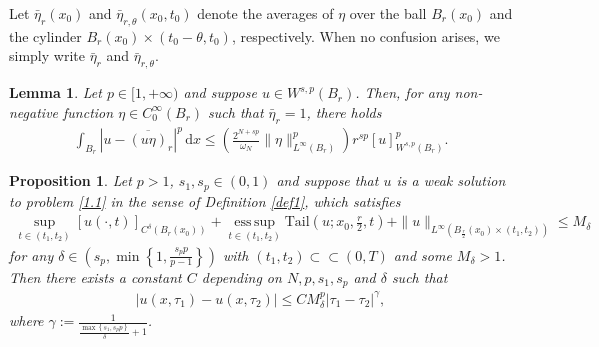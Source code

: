 \documentclass[reqno,10pt]{amsart}
\numberwithin{equation}{section}
\newtheorem{lemma}[theorem]{Lemma}
\newtheorem{proposition}[theorem]{Proposition}
\begin{document}
Let $\bar{\eta}_{r}(x_0)$ and $\bar{\eta}_{r,\theta}(x_0,t_0)$ denote the averages of $\eta$ over the ball $B_r(x_0)$ and the cylinder $B_r(x_0)\times(t_0-\theta,t_0)$, respectively. When no confusion arises, we simply write $\bar{\eta}_r$ and $\bar{\eta}_{r,\theta}$.
\begin{lemma}
	\label{lem25}
	Let $p\in[1,+\infty)$ and suppose $u\in W^{s,p}(B_r)$. Then, for any non-negative function $\eta\in C^\infty_0(B_r)$ such that $\bar{\eta}_r=1$, there holds
	\begin{align*}
		\int_{B_r}\left| u-\overline{(u\eta)}_r\right|^p\,\mathrm{d}x\le\left(\frac{2^{N+sp}}{\omega_N}\|\eta\|^p_{L^\infty(B_r)}\right)r^{sp}[u]^p_{W^{s,p}(B_r)}. 
	\end{align*}
\end{lemma}

\begin{proposition}
	\label{pro26}
	Let $p>1$, $s_1, s_p\in(0,1)$ and suppose that $u$ is a weak solution to problem \eqref{1.1} in the sense of Definition \ref{def1}, which satisfies
	\begin{align}
		\label{26.0}
		\sup\limits_{t\in(t_1,t_2)}[u(\cdot,t)]_{C^\delta(B_r(x_0))}+\operatorname*{ess\,sup}_{t\in(t_1,t_2)}\mathrm{Tail}\left(u;x_0,\frac{r}{2},t\right)+\|u\|_{L^\infty\left(B_{\frac{r}{2}}(x_0)\times(t_1,t_2)\right) }\le M_{\delta}
	\end{align}
	for any $\delta\in\left(s_p,\min\left\lbrace1,\frac{s_pp}{p-1}\right\rbrace \right)$ with $(t_1,t_2)\subset\subset(0,T)$ and some $M_\delta>1$. Then there exists a constant $C$ depending on $N, p, s_1, s_p$ and $\delta$ such that
	\begin{align*}
		|u(x,\tau_1)-u(x,\tau_2)|\le CM_\delta^p|\tau_1-\tau_2|^\gamma,
	\end{align*}
	where $\gamma:=\frac{1}{\frac{\max\left\lbrace s_1,s_pp\right\rbrace }{\delta}+1}$.
\end{proposition}
\end{document}
